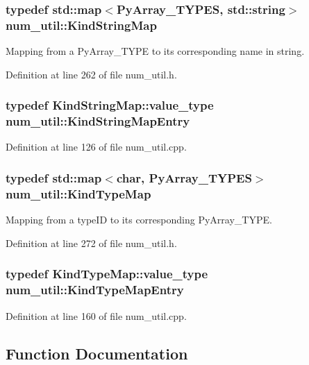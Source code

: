 \subsubsection{\setlength{\rightskip}{0pt plus 5cm}typedef std::map$<$Py\-Array\_\-TYPES, std::string$>$ {\bf num\_\-util::Kind\-String\-Map}}\label{namespacenum__util_a9}


Mapping from a Py\-Array\_\-TYPE to its corresponding name in string.

Definition at line 262 of file num\_\-util.h.
\subsubsection{\setlength{\rightskip}{0pt plus 5cm}typedef Kind\-String\-Map::value\_\-type {\bf num\_\-util::Kind\-String\-Map\-Entry}}\label{namespacenum__util_a0}




Definition at line 126 of file num\_\-util.cpp.
\subsubsection{\setlength{\rightskip}{0pt plus 5cm}typedef std::map$<$char, Py\-Array\_\-TYPES$>$ {\bf num\_\-util::Kind\-Type\-Map}}\label{namespacenum__util_a11}


Mapping from a type\-ID to its corresponding Py\-Array\_\-TYPE.

Definition at line 272 of file num\_\-util.h.
\subsubsection{\setlength{\rightskip}{0pt plus 5cm}typedef Kind\-Type\-Map::value\_\-type {\bf num\_\-util::Kind\-Type\-Map\-Entry}}\label{namespacenum__util_a4}




Definition at line 160 of file num\_\-util.cpp.

\subsection{Function Documentation}
